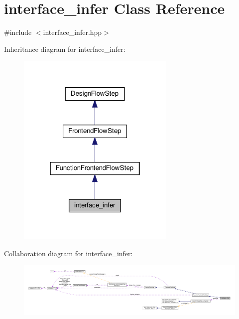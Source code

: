 \hypertarget{classinterface__infer}{}\section{interface\+\_\+infer Class Reference}
\label{classinterface__infer}


{\ttfamily \#include $<$interface\+\_\+infer.\+hpp$>$}



Inheritance diagram for interface\+\_\+infer\+:
\nopagebreak
\begin{figure}[H]
\begin{center}
\leavevmode
\includegraphics[width=214pt]{d7/d68/classinterface__infer__inherit__graph}
\end{center}
\end{figure}


Collaboration diagram for interface\+\_\+infer\+:
\nopagebreak
\begin{figure}[H]
\begin{center}
\leavevmode
\includegraphics[width=350pt]{d2/d55/classinterface__infer__coll__graph}
\end{center}
\end{figure}
